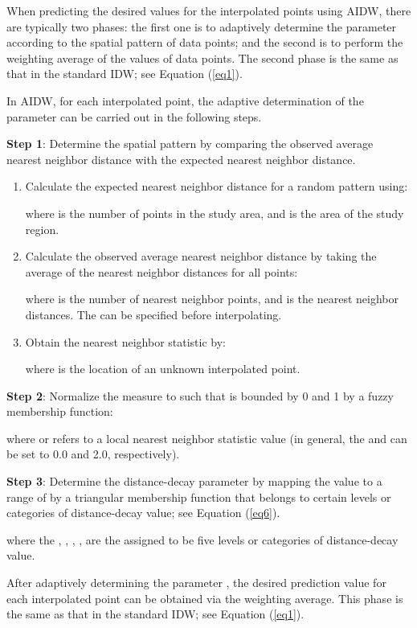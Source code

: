 \documentclass[fleqn,11pt]{wlscirep}
\begin{document}
When predicting the desired values for the interpolated points using AIDW, 
there are typically two phases: the first one is to adaptively determine the 
parameter  according to the spatial pattern of data points; and the 
second is to perform the weighting average of the values of data points. The 
second phase is the same as that in the standard IDW; see Equation (\ref{eq1}).

In AIDW, for each interpolated point, the adaptive determination of the 
parameter  can be carried out in the following steps.

\textbf{Step 1}: Determine the spatial pattern by comparing the observed 
average nearest neighbor distance with the expected nearest neighbor 
distance.

\begin{enumerate}[label=\arabic{*})]
	\item Calculate the expected nearest neighbor distance  for a random pattern using:

where  is the number of points in the study area, and  is the area of the 
study region.

	\item Calculate the observed average nearest neighbor distance  by taking the average of the nearest neighbor distances for all points:

where  is the number of nearest neighbor points, and  is the 
nearest neighbor distances. The  can be specified before interpolating.

	\item Obtain the nearest neighbor statistic  by:

where  is the location of an unknown interpolated point.
\end{enumerate}

\textbf{Step 2}: Normalize the  measure to  
such that  is bounded by 0 and 1 by a fuzzy membership function: 

where  or  refers to a local nearest neighbor 
statistic value (in general, the  and  can 
be set to 0.0 and 2.0, respectively).

\textbf{Step 3}: Determine the distance-decay parameter  by mapping 
the  value to a range of  by a triangular 
membership function that belongs to certain levels or categories of 
distance-decay value; see Equation (\ref{eq6}).

where the , , , ,  are the assigned to be five levels or categories of 
distance-decay value.

After adaptively determining the parameter , the desired prediction 
value for each interpolated point can be obtained via the weighting average. 
This phase is the same as that in the standard IDW; see Equation (\ref{eq1}).
\end{document}
